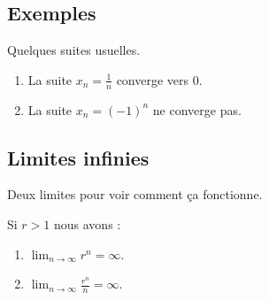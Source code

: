 \subsection{Exemples}

\begin{lemma}       \label{LEMooNDSKooMsexOq}
	Quelques suites usuelles.
	\begin{enumerate}
		\item
		      La suite \( x_n=\frac{1}{ n }\) converge vers \( 0\).
		\item
		      La suite \( x_n=(-1)^n\) ne converge pas.
	\end{enumerate}
\end{lemma}

\subsection{Limites infinies}

Deux limites pour voir comment ça fonctionne.
\begin{lemma}       \label{LEMooWCRSooWXVvcc}
	Si \( r>1\) nous avons :
	\begin{enumerate}
		\item
		      \( \lim_{n\to \infty} r^n=\infty\).
		\item
		      \( \lim_{n\to \infty} \frac{ r^n }{ n }=\infty\).
	\end{enumerate}
\end{lemma}

